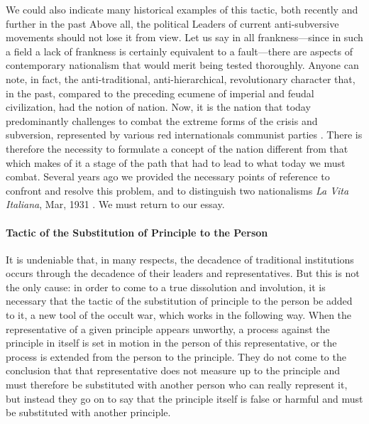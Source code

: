 We could also indicate many historical examples of this tactic, both recently and further in the past Above all, the political Leaders of current anti-subversive movements should not lose it from view. Let us say in all frankness---since in such a field a lack of frankness is certainly equivalent to a fault---there are aspects of contemporary nationalism that would merit being tested thoroughly. Anyone can note, in fact, the anti-traditional, anti-hierarchical, revolutionary character that, in the past, compared to the preceding ecumene of imperial and feudal civilization, had the notion of nation. Now, it is the nation that today predominantly challenges to combat the extreme forms of the crisis and subversion, represented by various red internationals communist parties . There is therefore the necessity to formulate a concept of the nation different from that which makes of it a stage of the path that had to lead to what today we must combat. Several years ago we provided the necessary points of reference to confront and resolve this problem, and to distinguish two nationalisms \emph{La Vita Italiana}, Mar, 1931 . We must return to our essay.

\paragraph{Tactic of the Substitution of Principle to the Person}


It is undeniable that, in many respects, the decadence of traditional institutions occurs through the decadence of their leaders and representatives. But this is not the only cause: in order to come to a true dissolution and involution, it is necessary that the tactic of the substitution of principle to the person be added to it, a new tool of the occult war, which works in the following way. When the representative of a given principle appears unworthy, a process against the principle in itself is set in motion in the person of this representative, or the process is extended from the person to the principle. They do not come to the conclusion that that representative does not measure up to the principle and must therefore be substituted with another person who can really represent it, but instead they go on to say that the principle itself is false or harmful and must be substituted with another principle.

